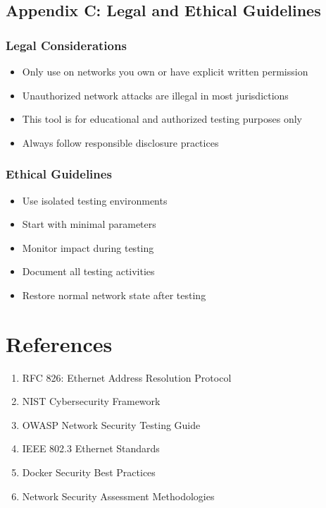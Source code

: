 \documentclass[12pt,a4paper]{article}
\begin{document}
\subsection{Appendix C: Legal and Ethical Guidelines}

\subsubsection{Legal Considerations}
\begin{itemize}
    \item Only use on networks you own or have explicit written permission
    \item Unauthorized network attacks are illegal in most jurisdictions
    \item This tool is for educational and authorized testing purposes only
    \item Always follow responsible disclosure practices
\end{itemize}

\subsubsection{Ethical Guidelines}
\begin{itemize}
    \item Use isolated testing environments
    \item Start with minimal parameters
    \item Monitor impact during testing
    \item Document all testing activities
    \item Restore normal network state after testing
\end{itemize}

\section{References}

\begin{enumerate}
    \item RFC 826: Ethernet Address Resolution Protocol
    \item NIST Cybersecurity Framework
    \item OWASP Network Security Testing Guide
    \item IEEE 802.3 Ethernet Standards
    \item Docker Security Best Practices
    \item Network Security Assessment Methodologies
\end{enumerate}
\end{document}

